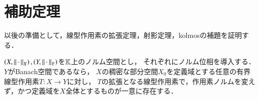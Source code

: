 \section{補助定理}
以後の準備として，線型作用素の拡張定理，射影定理，kolmosの補題を証明する．
\begin{itembox}[l]{}
	\begin{thm}[線型作用素の拡張]
		$\left( X,\left\|\, \cdot\, \right\|_{X} \right),\left( Y,\left\|\, \cdot\, \right\|_{Y} \right)$を$\mathbb{K}$上のノルム空間とし，
		それぞれにノルム位相を導入する．$Y$がBanach空間であるなら，
		$X$の稠密な部分空間$X_0$を定義域とする任意の有界線型作用素$T:X \rightarrow Y$に対し，
		$T$の拡張となる線型作用素で，作用素ノルムを変えず，かつ定義域を$X$全体とするものが一意に存在する．
		\label{thm:linear_operator_expansion}
	\end{thm}
\end{itembox}
